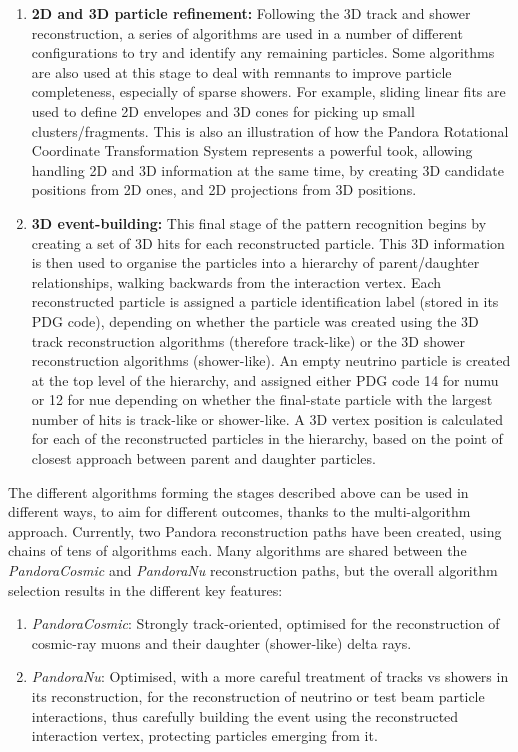 \begin{enumerate}
\item{\bf 2D and 3D particle refinement:} Following the 3D track and shower reconstruction, a series of algorithms are used in a number of different configurations to try and identify any remaining particles. Some algorithms are also used at this stage to deal with remnants to improve particle completeness, especially of sparse showers. For example, sliding linear fits are used to define 2D envelopes and 3D cones for picking up small clusters/fragments. This is also an illustration of how the Pandora Rotational Coordinate Transformation System represents a powerful took, allowing handling 2D and 3D information at the same time, by creating 3D candidate positions from 2D ones, and 2D projections from 3D positions. 
\item{\bf 3D event-building:} This final stage of the pattern recognition begins by creating a set of 3D hits for each reconstructed particle. This 3D information is then used to organise the particles into a hierarchy of parent/daughter relationships, walking backwards from the interaction vertex. Each reconstructed particle is assigned a particle identification label (stored in its PDG code), depending on whether the particle was created using the 3D track reconstruction algorithms (therefore track-like) or the 3D shower reconstruction algorithms (shower-like). An empty neutrino particle is created at the top level of the hierarchy, and assigned either PDG code 14 for numu or 12 for nue depending on whether the final-state particle with the largest number of hits is track-like or shower-like. A 3D vertex position is calculated for each of the reconstructed particles in the hierarchy, based on the point of closest approach between parent and daughter particles.
\end{enumerate}

The different algorithms forming the stages described above can be used in different ways, to aim for different outcomes, thanks to the multi-algorithm approach. Currently, two Pandora reconstruction paths have been created, using chains of tens of algorithms each. Many algorithms are shared between the  {\it PandoraCosmic} and {\it PandoraNu} reconstruction paths, but the overall algorithm selection results in the different key features:
\begin{enumerate}
\item {\it PandoraCosmic}: Strongly track-oriented, optimised for the reconstruction of cosmic-ray muons and their daughter (shower-like) delta rays. 
\item {\it PandoraNu}: Optimised, with a more careful treatment of tracks vs showers in its reconstruction, for the reconstruction of neutrino or test beam particle interactions, thus carefully building the event using the reconstructed interaction vertex, protecting particles emerging from it. 
\end{enumerate}

